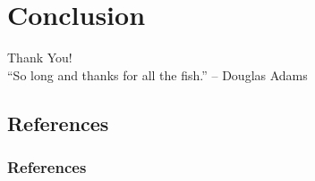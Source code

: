 \documentclass[pdf]{beamer}
\begin{document}
\section{Conclusion}
\begin{frame}[c]
  \begin{center}
    \Huge Thank You!\\ \vspace{2mm}
    \tiny ``So long and thanks for all the fish.''  -- Douglas Adams
  \end{center}
\end{frame}
\subsection{References}
\begin{frame}[allowframebreaks]
  \frametitle{References}
  
  
\end{frame}
\end{document}
